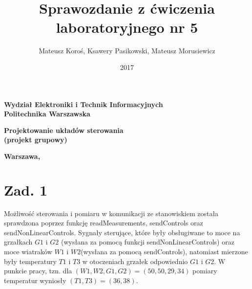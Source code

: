 \documentclass[a4paper,titlepage,11pt,twosides,floatssmall]{mwrep}
\begin{document}
\frenchspacing
\pagestyle{uheadings}

\title{\bf Sprawozdanie z ćwiczenia laboratoryjnego nr 5 \vskip 0.1cm}
\author{Mateusz Koroś, Ksawery Pasikowski, Mateusz Morusiewicz}
\date{2017}

\makeatletter
\renewcommand{\maketitle}{\begin{titlepage}
\begin{center}{\LARGE {\bf
Wydział Elektroniki i Technik Informacyjnych}}\\
\vspace{0.4cm}
{\LARGE {\bf Politechnika Warszawska}}\\
\vspace{0.3cm}
\end{center}
\vspace{5cm}
\begin{center}
{\bf \LARGE Projektowanie układów sterowania\\ (projekt grupowy) \vskip 0.1cm}
\end{center}
\vspace{1cm}
\begin{center}
{\bf \LARGE \@title}
\end{center}
\vspace{2cm}
\begin{center}
{\bf \Large \@author \par}
\end{center}
\vspace*{\stretch{6}}
\begin{center}
\bf{\large{Warszawa, \@date\vskip 0.1cm}}
\end{center}
\end{titlepage}
}
\makeatother

\maketitle

\tableofcontents


\chapter{Zad. 1}
Możliwość sterowania i pomiaru w komunikacji ze stanowiskiem została sprawdzona poprzez funkcję readMeasurements, sendControls oraz sendNonLinearControls. Sygnały sterujące, które były obsługiwane to moce na grzałkach $G1$ i $G2$ (wysłana za pomocą funkcji sendNonLinearControls) oraz moce wiatraków $ W1 $ i $ W2 $(wysłana za pomocą sendControls), natomiast mierzone były temperatury $ T1 $ i $ T3 $ w otoczeniach grzałek odpowiednio $ G1 $ i $ G2 $. W punkcie pracy, tzn. dla $ (W1, W2, G1, G2) = (50, 50, 29, 34) $ pomiary temperatur wyniosły $(T1, T3) = (36, 38)$.
\begingroup
\renewcommand{\cleardoublepage}{}
\renewcommand{\clearpage}{}
\end{document}
